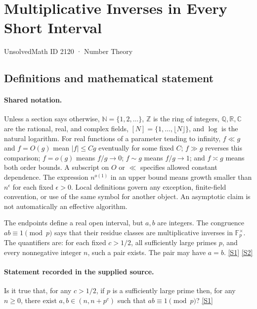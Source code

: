 \documentclass[11pt,a4paper]{article}
\newcommand{\N}{\mathbb{N}}
\newcommand{\Z}{\mathbb{Z}}
\newcommand{\Q}{\mathbb{Q}}
\newcommand{\R}{\mathbb{R}}
\newcommand{\C}{\mathbb{C}}
\newcommand{\sref}[2]{\hyperlink{source:#1:#2}{[S#2]}}
\begin{document}

\setcounter{section}{2119}

\section{Multiplicative Inverses in Every Short Interval}\label{2120}

{\small\sffamily UnsolvedMath ID 2120 · Number Theory}

\subsection{Definitions and mathematical statement}

\paragraph{Shared notation.}Unless a section says otherwise, $\N=\{1,2,\ldots\}$,
$\Z$ is the ring of integers, $\Q,\R,\C$ are the rational, real, and complex
fields, $[N]=\{1,\ldots,\lfloor N\rfloor\}$, and $\log$ is the natural
logarithm. For real functions of a parameter tending to infinity,
$f\ll g$ and $f=O(g)$ mean $|f|\leq Cg$ eventually for some fixed $C$;
$f\gg g$ reverses this comparison; $f=o(g)$ means $f/g\to0$;
$f\sim g$ means $f/g\to1$; and $f\asymp g$ means both order bounds.
A subscript on $O$ or $\ll$ specifies allowed constant dependence.
The expression $n^{o(1)}$ in an upper bound means growth smaller than
$n^\epsilon$ for each fixed $\epsilon>0$. Local definitions govern any
exception, finite-field convention, or use of the same symbol for another
object. An asymptotic claim is not automatically an effective algorithm.



The endpoints define a real open interval, but $a,b$ are integers. The congruence $ab\equiv1\pmod p$ says that their residue classes are multiplicative inverses in $\mathbb F_p^\times$. The quantifiers are: for each fixed $c>1/2$, all sufficiently large primes $p$, and every nonnegative integer $n$, such a pair exists. The pair may have $a=b$. \sref{2120}{1} \sref{2120}{2}

\paragraph{Statement recorded in the supplied source.}
Is it true that, for any $c>1/2$, if $p$ is a sufficiently large prime then, for any $n\geq 0$, there exist $a,b\in(n,n+p^c)$ such that $ab\equiv 1\pmod{p}$? \sref{2120}{1}
\end{document}
